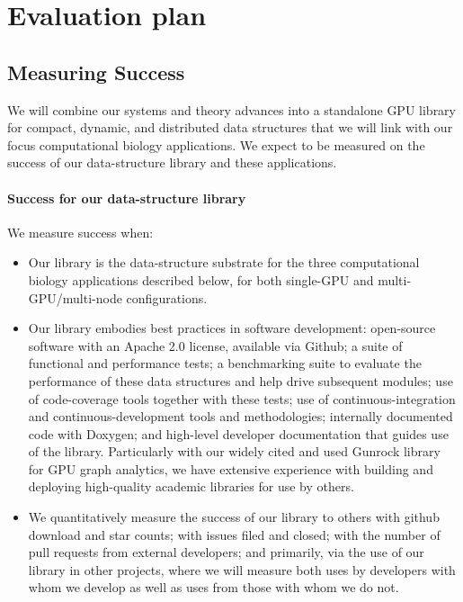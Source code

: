 \section{Evaluation plan}


\subsection{Measuring Success} We will combine our systems and theory advances into a standalone GPU library for compact, dynamic, and distributed data structures that we will link with our focus computational biology applications. We expect to be measured on the success of our data-structure library and these applications.

\noindent
\paragraph{Success for our data-structure library}

We measure success when:

\label{sec:sw-methodology}

\begin{itemize}[leftmargin=*,noitemsep]
  \item Our library is the data-structure substrate for the three computational biology applications described below, for both single-GPU and multi-GPU/multi-node configurations.
  \item Our library embodies best practices in software development: open-source software with an Apache 2.0 license, available via Github; a suite of functional and performance tests; a benchmarking suite to evaluate the performance of these data structures and help drive subsequent modules; use of code-coverage tools together with these tests; use of continuous-integration and continuous-development tools and methodologies; internally documented code with Doxygen; and high-level developer documentation that guides use of the library. Particularly with our widely cited and used Gunrock library~\cite{Wang:2017:GGG} for GPU graph analytics, we have extensive experience with building and deploying high-quality academic libraries for use by others. 
  \item We quantitatively measure the success of our library to others with github download and star counts; with issues filed and closed; with the number of pull requests from external developers; and primarily, via the use of our library in other projects, where we will measure both uses by developers with whom we develop as well as uses from those with whom we do not.
\end{itemize}

